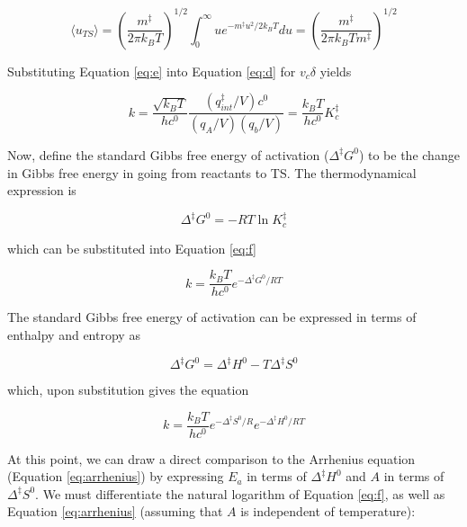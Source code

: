 \begin{equation}
  \langle u_{TS} \rangle = \left( \frac{m^\ddagger}{2\pi k_BT} \right)^{1/2}
  \int_0^\infty u e^{-m^\ddagger u^2/2k_BT}du = \left( \frac{m^\ddagger}{2\pi
      k_BT m^\ddagger} \right)^{1/2}
\label{eq:e}
\end{equation}

\noindent Substituting Equation \ref{eq:e} into Equation \ref{eq:d} for $v_c\delta$ yields

\begin{equation}
  k =
  \frac{\sqrt{k_BT}}{hc^0}\frac{(q_{int}^\ddagger/V)c^0}{(q_A/V)(q_b/V)} = \frac{k_BT}{hc^0}K_c^\ddagger
\label{eq:f}
\end{equation}

Now, define the standard Gibbs free energy of activation ($\Delta ^\ddagger G^0$) to be the change in Gibbs free energy in going from reactants to TS. The thermodynamical expression is

\begin{equation}
  \Delta ^\ddagger G^0 = -RT \ln K_c^\ddagger
\end{equation}

\noindent which can be substituted into Equation \ref{eq:f}

\begin{equation}
  k = \frac{k_BT}{hc^0} e^{-\Delta^\ddagger G^0/RT}
\label{eq:g}
\end{equation}

The standard Gibbs free energy of activation can be expressed in terms of enthalpy and entropy as

\begin{equation}
  \Delta^\ddagger G^0 = \Delta^\ddagger H^0 - T \Delta^\ddagger S^0
\end{equation}

\noindent which, upon substitution gives the equation

\begin{equation}
  k = \frac{k_BT}{hc^0} e^{-\Delta^\ddagger S^0/R} e^{-\Delta^\ddagger H^0/RT}
\label{eq:M}
\end{equation}

At this point, we can draw a direct comparison to the Arrhenius equation (Equation \ref{eq:arrhenius}) by expressing $E_a$ in terms of $\Delta^\ddagger H^0$ and $A$ in terms of $\Delta^\ddagger S^0$.  We must differentiate the natural logarithm of Equation \ref{eq:f}, as well as Equation \ref{eq:arrhenius} (assuming that $A$ is independent of temperature):

